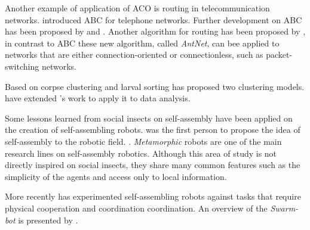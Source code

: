 Another example of application of \ac{ACO} is routing in telecommunication networks. \citeauthor{Schoonderwoerd96ant-basedload} \cite{Schoonderwoerd96ant-basedload} introduced \ac{ABC} for telephone networks. Further development on \ac{ABC} has been proposed by \citeauthor{Heusse98adaptiveagent-driven} \cite{Heusse98adaptiveagent-driven} and \citeauthor{Subramanian98antsand} \cite{Subramanian98antsand}. Another algorithm for routing has been proposed by \citeauthor{Caro98antnet:distributed} \cite{Caro98antnet:distributed, Caro97antnet:a, DiCaro:1998:ADS:1622797.1622806}, in contrast to  \ac{ABC} these new algorithm, called \emph{AntNet}, can bee applied to networks that are either connection-oriented or connectionless, such as packet-switching networks.

Based on corpse clustering and larval sorting \citeauthor{citeulike:1646663} \cite{citeulike:1646663} has proposed two clustering models.  \citeauthor{lumer_faieta_1994} \cite{lumer_faieta_1994} have extended \citeauthor{citeulike:1646663}'s work to apply it to data analysis.

Some lessons learned from social insects on self-assembly have been applied on the creation of self-assembling robots. \citeauthor{100066} \cite{100066} was the first person to propose the idea of self-assembly to the robotic field. \cite{bonabeau1999swarm}. \emph{Metamorphic} robots \cite{Chirikjian94} are one of the main research lines on self-assembly robotics. Although this area of study is not directly inspired on social insects, they share many common features such as the simplicity of the agents and access only to local information.

More recently \citeauthor{Dorigo05swarm-bot:an} \cite{Dorigo05swarm-bot:an} has experimented self-assembling robots against tasks that require physical cooperation and coordination coordination. An overview of the \emph{Swarm-bot} \cite{Dorigo05swarm-bot:an} is presented by \citeauthor{6094854} \cite{6094854}.





